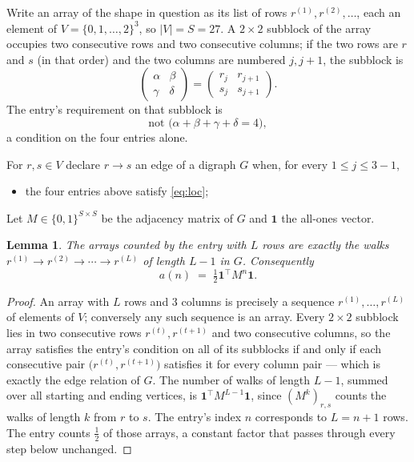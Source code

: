\documentclass[11pt,a4paper]{article}
\theoremstyle{plain}
\newtheorem{lemma}[theorem]{Lemma}
\theoremstyle{definition}
\begin{document}
Write an array of the shape in question as its list of rows
$r^{(1)},r^{(2)},\dots$, each an element of
$V=\{0,1,\dots,2\}^{3}$, so $|V|=S=27$. A $2\times2$ subblock of the array
occupies two consecutive rows and two consecutive columns; if the two rows are $r$
and $s$ (in that order) and the two columns are numbered $j,j+1$,
the subblock is
\[
\begin{pmatrix}\alpha&\beta\\\gamma&\delta\end{pmatrix}=\begin{pmatrix}r_j&r_{j+1}\\s_j&s_{j+1}\end{pmatrix}.
\]
The entry's requirement on that subblock is
\begin{equation}\label{eq:loc}
\text{not }\bigl(\alpha+\beta+\gamma+\delta=4\bigr),
\end{equation}
a condition on the four entries alone.

For $r,s\in V$ declare $r\to s$ an edge of a digraph $G$ when, for every
$1\le j\le 3-1$,
\begin{itemize}
\item the four entries above satisfy \eqref{eq:loc};

\end{itemize}
Let $M\in\{0,1\}^{S\times S}$ be the adjacency matrix of $G$ and $\mathbf{1}$ the
all-ones vector.

\begin{lemma}\label{lem:walk}
The arrays counted by the entry with $L$ rows are exactly the walks
$r^{(1)}\to r^{(2)}\to\cdots\to r^{(L)}$ of length $L-1$ in $G$. Consequently
\[
a(n)\;=\;\tfrac1{2}\mathbf{1}^{\!\top}M^{n}\mathbf{1} .
\]
\end{lemma}

\begin{proof}
An array with $L$ rows and $3$ columns is precisely a sequence
$r^{(1)},\dots,r^{(L)}$ of elements of $V$; conversely any such sequence is an array.
Every $2\times2$ subblock lies in two consecutive rows $r^{(t)},r^{(t+1)}$ and two
consecutive columns, so the array satisfies the entry's condition on all of its subblocks
if and only if each consecutive pair $\bigl(r^{(t)},r^{(t+1)}\bigr)$ satisfies it for
every column pair --- which is exactly the edge relation of $G$. The number of walks of
length $L-1$, summed over all starting and ending vertices, is
$\mathbf{1}^{\!\top}M^{L-1}\mathbf{1}$, since $(M^{k})_{r,s}$ counts the walks of
length $k$ from $r$ to $s$. The entry's index $n$ corresponds to $L=n+1$ rows. The entry counts $\tfrac1{2}$ of those arrays, a constant factor that passes through every step below unchanged.
\end{proof}
\end{document}
